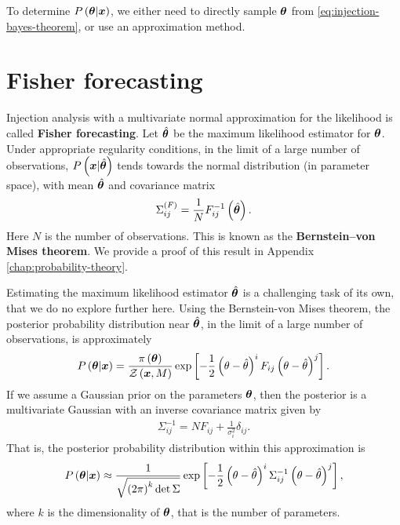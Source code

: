 To determine $P\left({\bm \theta}|{\bm x}\right)$, we either need to directly
sample ${\bm \theta}$ from \eqref{eq:injection-bayes-theorem}, or use an approximation method.
\section{Fisher forecasting}

Injection analysis with a multivariate normal approximation for the likelihood is called
\textbf{Fisher forecasting}.
Let $\hat{{\bm \theta}}$ be the maximum likelihood estimator for ${\bm \theta}$.
Under appropriate regularity conditions, in the limit of a large number of observations,
$P\left({\bm x}|\hat{{\bm \theta}}\right)$ tends towards the normal
distribution (in parameter space), with mean $\hat{{\bm \theta}}$ 
and covariance matrix 
\begin{align}
    \label{eq:bvm-thm-cov}
    \Sigma^{(F)}_{ij}= \frac{1}{N}F^{-1}_{ij}\left(\hat{{\bm \theta}}\right)
    .
\end{align}
Here $N$ is the number of observations.
This is known as the \textbf{Bernstein–von Mises theorem}. 
We provide a proof of this result in Appendix \ref{chap:probability-theory}.

Estimating the maximum likelihood estimator $\hat{{\bm \theta}}$ is a challenging task of its own, 
that we do no explore further here.
Using the Bernstein-von Mises theorem, the posterior probability distribution near $\hat{{\bm \theta}}$, 
in the limit of a large number of observations, is approximately 
\begin{align}
    P\left({\bm \theta}|{\bm x}\right)
    = 
    \frac{\pi\left({\bm \theta}\right)}{\mathcal{Z}\left({\bm x},M\right)}
    \exp\left[
        -
        \frac{1}{2}
        \left(\theta-\hat{\theta}\right)^i
        F_{ij}
        \left(\theta-\hat{\theta}\right)^j
    \right]
    .
\end{align}
If we assume a Gaussian prior on the parameters ${\bm \theta}$, then the
posterior is a multivariate Gaussian with an inverse covariance matrix given by
\begin{align}
    \label{eq:Fisher-injection-inverse-covariance}
    \Sigma_{ij}^{-1} 
    = 
    N F_{ij} 
    + 
    \frac{1}{\sigma_i^2}\delta_{ij} 
    .
\end{align}
That is, the posterior probability distribution within this approximation is
\begin{align}
    P\left({\bm \theta}|{\bm x}\right)
    \approx
    \frac{1}{\sqrt{\left(2\pi\right)^k\det\Sigma}}
    \exp\left[
        -
        \frac{1}{2}
        \left(\theta-\hat{\theta}\right)^i
        \Sigma^{-1}_{ij}
        \left(\theta-\hat{\theta}\right)^j
    \right]
    ,
\end{align}
where $k$ is the dimensionality of ${\bm \theta}$, that is the number of parameters.

